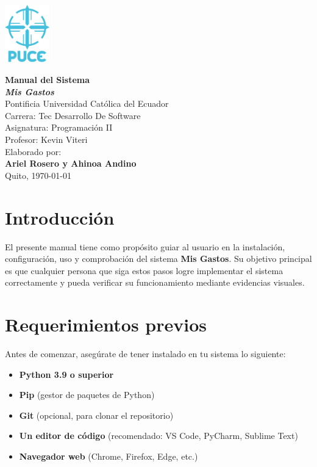 \documentclass[12pt,a4paper]{article}
\begin{document}
\begin{titlepage}
\begin{flushright}   
 \vspace*{-2cm}
 \includegraphics[height=2.5cm]{Imagenes/logo puce.png} 
\end{flushright}
 \centering
 \vspace*{1cm}
 {\Huge\bfseries Manual del Sistema\\[1.5ex] \textit{Mis Gastos}}\\[2cm]
 {\Large Pontificia Universidad Católica del Ecuador}\\[1cm]
 {\large Carrera: Tec Desarrollo De Software}\\[0.5cm]
 {\large Asignatura: Programación II}\\[0.5cm]
 {\large Profesor: Kevin Viteri}\\[1cm]
 {\large Elaborado por:}\\[0.3cm]
 {\bfseries Ariel Rosero y Ahinoa Andino}\\[2cm]
 {\large Quito, \today}
 \vfill
\end{titlepage}

\tableofcontents
\newpage

\section{Introducción}
El presente manual tiene como propósito guiar al usuario en la instalación, configuración, uso y comprobación del sistema \textbf{Mis Gastos}. Su objetivo principal es que cualquier persona que siga estos pasos logre implementar el sistema correctamente y pueda verificar su funcionamiento mediante evidencias visuales.

\section{Requerimientos previos}
Antes de comenzar, asegúrate de tener instalado en tu sistema lo siguiente:

\begin{itemize}
    \item \textbf{Python 3.9 o superior}
    \item \textbf{Pip} (gestor de paquetes de Python)
    \item \textbf{Git} (opcional, para clonar el repositorio)
    \item \textbf{Un editor de código} (recomendado: VS Code, PyCharm, Sublime Text)
    \item \textbf{Navegador web} (Chrome, Firefox, Edge, etc.)
\end{itemize}
\end{document}
